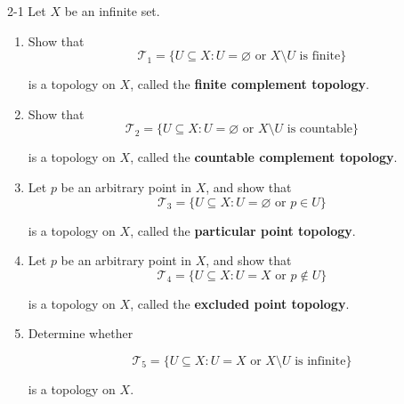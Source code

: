 \begin{problem}{2-1}
Let $X$ be an infinite set.
\begin{enumerate}[label={(\alph*)}]
	\item Show that
	      \[
		      \mathscr{T}_{1} = \{ U\subseteq X : U = \varnothing \text{ or } X\setminus U \text{ is finite} \}
	      \]

	      is a topology on $X$, called the \textbf{finite complement topology}.

	\item Show that
	      \[
		      \mathscr{T}_{2} = \{ U\subseteq X : U = \varnothing \text{ or } X\setminus U \text{ is countable} \}
	      \]

	      is a topology on $X$, called the \textbf{countable complement topology}.

	\item Let $p$ be an arbitrary point in $X$, and show that
	      \[
		      \mathscr{T}_{3} = \{ U\subseteq X : U = \varnothing \text{ or } p\in U \}
	      \]

	      is a topology on $X$, called the \textbf{particular point topology}.

	\item Let $p$ be an arbitrary point in $X$, and show that
	      \[
		      \mathscr{T}_{4} = \{ U\subseteq X : U = X \text{ or } p\notin U \}
	      \]

	      is a topology on $X$, called the \textbf{excluded point topology}.

	\item Determine whether

	      \[
		      \mathscr{T}_{5} = \{ U\subseteq X : U = X \text{ or } X\setminus U \text{ is infinite} \}
	      \]

	      is a topology on $X$.
\end{enumerate}
\end{problem}

